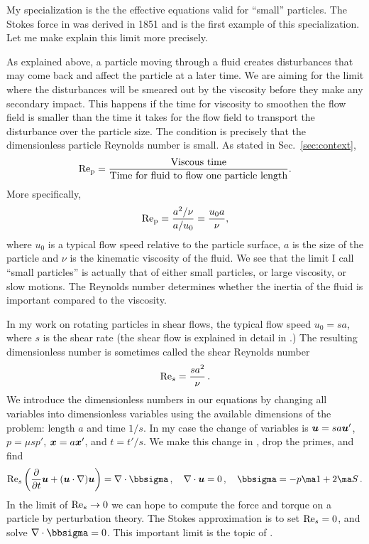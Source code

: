 \documentclass[thesis.tex]{subfiles}
\begin{document}
My specialization is the the effective equations valid for ``small'' particles. The Stokes force in  was derived in 1851 \cite{stokes1851} and is the first example of this specialization. Let me make explain this limit more precisely.

As explained above, a particle moving through a fluid creates disturbances that may come back and affect the particle at a later time. We are aiming for the limit where the disturbances will be smeared out by the viscosity before they make any secondary impact. This happens if the time for viscosity to smoothen the flow field is smaller than the time it takes for the flow field to transport the disturbance over the particle size. The condition is precisely that the dimensionless particle Reynolds number is small. As stated in Sec.~\ref{sec:context},
\begin{align}
 	\mbox{Re}_{\mathrm p} = \frac{\textrm{Viscous time}}{\textrm{Time for fluid to flow one particle length}}.
\end{align}
More specifically,
\begin{align}
	\mbox{Re}_{\mathrm p} = \frac{a^2/\nu}{a/u_0} = \frac{u_0 a}{\nu},
\end{align}
where $u_0$ is a typical flow speed relative to the particle surface, $a$ is the size of the particle and $\nu$ is the kinematic viscosity of the fluid. We see that the limit I call ``small particles'' is actually that of either small particles, or large viscosity, or slow motions. The Reynolds number determines whether the inertia of the fluid is important compared to the viscosity.

In my work on rotating particles in shear flows, the typical flow speed $u_0 = sa$, where $s$ is the shear rate (the shear flow is explained in detail in .) The resulting dimensionless number is sometimes called the shear Reynolds number
\begin{align}
	\textrm{Re}_s = \frac{sa^2}{\nu}\,.
\end{align}
We introduce the dimensionless numbers in our equations by changing all variables into dimensionless variables using the available dimensions of the problem: length $a$ and time $1/s$. In my case the change of variables is $\mbox{\boldmath$u$} = sa \mbox{\boldmath$u$}'$, $p=\mu s p'$, $\mbox{\boldmath$x$}= a\mbox{\boldmath$x$}'$, and $t=t'/s$. We make this change in , drop the primes, and find
\begin{align}
\Reys \left(\pdiff{}{t}\ve u + (\ve u \cdot \nabla) \ve u\right)=\nabla \cdot \bbsigma\,,\quad \nabla \cdot \ve u = 0\,,\quad \bbsigma = -p \ma 1 + 2\ma S\,.\eqnlab{nsintrodimless}
\end{align}
In the limit of $\textrm{Re}_s\to 0$ we can hope to compute the force and torque on a particle by perturbation theory. The Stokes approximation is to set $\textrm{Re}_s=0$, and solve $\nabla \cdot \bbsigma=0$. This important limit is the topic of .
\end{document}

